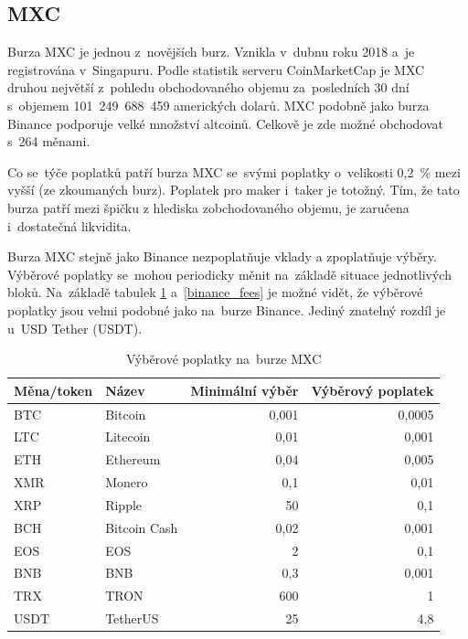 \documentclass[thesis=B,czech]{FITthesis}[2019/03/21]
\begin{document}
\subsection{MXC}
Burza MXC je jednou z~novějších burz. Vznikla v~dubnu roku 2018 a~je registrována v~Singapuru. Podle statistik serveru CoinMarketCap je MXC druhou největší z~pohledu obchodovaného objemu za~posledních 30 dní s~objemem 101~249~688~459 amerických dolarů. \cite{coinmarketcap} MXC podobně jako burza Binance podporuje velké množství altcoinů. Celkově je zde možné obchodovat s~264 měnami. \cite{mxc_coins}

Co se~týče poplatků patří burza MXC se~svými poplatky o~velikosti 0,2~\% mezi vyšší (ze zkoumaných burz). Poplatek pro maker i~taker je totožný. Tím, že tato burza patří mezi špičku z hlediska zobchodovaného objemu, je zaručena i~dostatečná likvidita. \cite{cryptowisser_mxc} 

Burza MXC stejně jako Binance nezpoplatňuje vklady a zpoplatňuje výběry. Výběrové poplatky se~mohou periodicky měnit na~základě situace jednotlivých bloků. \cite{mxc_fees} Na~základě tabulek \ref{mxc_fees} a~\ref{binance_fees} je možné vidět, že výběrové poplatky jsou velmi podobné jako na~burze Binance. Jediný znatelný rozdíl je u~USD Tether (USDT). \cite{cryptowisser_mxc}

\begin{table}[hb]\centering
    \caption{Výběrové poplatky na~burze MXC \cite{mxc_fees}}
    \label{mxc_fees}
     \begin{tabular}{||l | l | r | r||} 
     \hline
     Měna/token & Název & Minimální výběr & Výběrový poplatek \\ [0.5ex] 
     \hline\hline
     BTC & Bitcoin & 0,001 & 0,0005 \\ 
     \hline
     LTC & Litecoin & 0,01 & 0,001 \\
     \hline
     ETH & Ethereum & 0,04 & 0,005 \\
     \hline
     XMR & Monero & 0,1 & 0,01 \\
     \hline
     XRP & Ripple & 50 & 0,1 \\
     \hline
     BCH & Bitcoin Cash & 0,02 & 0,001 \\
     \hline
     EOS & EOS & 2 & 0,1 \\
     \hline
     BNB & BNB & 0,3 & 0,001 \\
     \hline
     TRX & TRON & 600 & 1 \\
     \hline
     USDT & TetherUS & 25 & 4,8 \\
     \hline
    \end{tabular}
\end{table}
\end{document}
